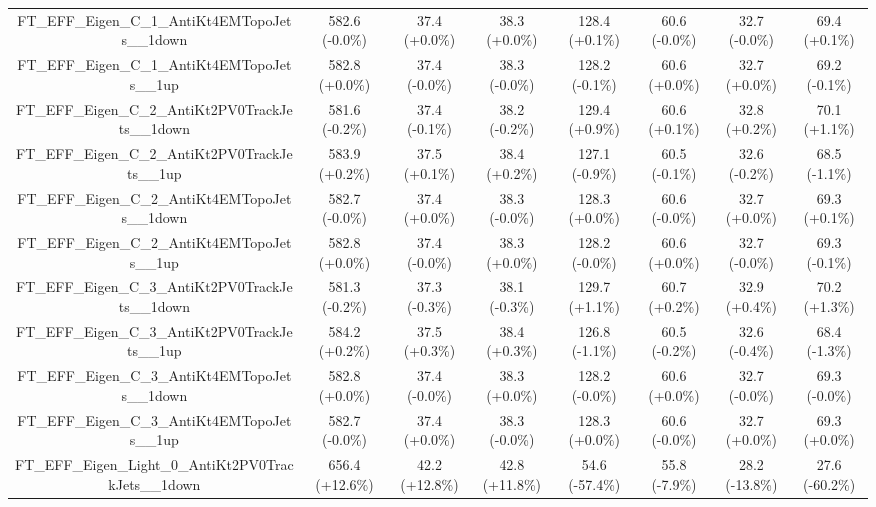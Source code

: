 \begin{table}[htbp!]
\begin{tiny}
\begin{center}
\begin{tabular}{c|c|c|c||c|c|c|c}
FT\_EFF\_Eigen\_C\_1\_AntiKt4EMTopoJets\_\_1down             & 582.6     (-0.0\%) & 37.4      (+0.0\%) & 38.3      (+0.0\%) & 128.4     (+0.1\%) & 60.6      (-0.0\%) & 32.7      (-0.0\%) & 69.4      (+0.1\%) \\ 
FT\_EFF\_Eigen\_C\_1\_AntiKt4EMTopoJets\_\_1up               & 582.8     (+0.0\%) & 37.4      (-0.0\%) & 38.3      (-0.0\%) & 128.2     (-0.1\%) & 60.6      (+0.0\%) & 32.7      (+0.0\%) & 69.2      (-0.1\%) \\ 
FT\_EFF\_Eigen\_C\_2\_AntiKt2PV0TrackJets\_\_1down           & 581.6     (-0.2\%) & 37.4      (-0.1\%) & 38.2      (-0.2\%) & 129.4     (+0.9\%) & 60.6      (+0.1\%) & 32.8      (+0.2\%) & 70.1      (+1.1\%) \\ 
FT\_EFF\_Eigen\_C\_2\_AntiKt2PV0TrackJets\_\_1up             & 583.9     (+0.2\%) & 37.5      (+0.1\%) & 38.4      (+0.2\%) & 127.1     (-0.9\%) & 60.5      (-0.1\%) & 32.6      (-0.2\%) & 68.5      (-1.1\%) \\ 
FT\_EFF\_Eigen\_C\_2\_AntiKt4EMTopoJets\_\_1down             & 582.7     (-0.0\%) & 37.4      (+0.0\%) & 38.3      (-0.0\%) & 128.3     (+0.0\%) & 60.6      (-0.0\%) & 32.7      (+0.0\%) & 69.3      (+0.1\%) \\ 
FT\_EFF\_Eigen\_C\_2\_AntiKt4EMTopoJets\_\_1up               & 582.8     (+0.0\%) & 37.4      (-0.0\%) & 38.3      (+0.0\%) & 128.2     (-0.0\%) & 60.6      (+0.0\%) & 32.7      (-0.0\%) & 69.3      (-0.1\%) \\ 
FT\_EFF\_Eigen\_C\_3\_AntiKt2PV0TrackJets\_\_1down           & 581.3     (-0.2\%) & 37.3      (-0.3\%) & 38.1      (-0.3\%) & 129.7     (+1.1\%) & 60.7      (+0.2\%) & 32.9      (+0.4\%) & 70.2      (+1.3\%) \\ 
FT\_EFF\_Eigen\_C\_3\_AntiKt2PV0TrackJets\_\_1up             & 584.2     (+0.2\%) & 37.5      (+0.3\%) & 38.4      (+0.3\%) & 126.8     (-1.1\%) & 60.5      (-0.2\%) & 32.6      (-0.4\%) & 68.4      (-1.3\%) \\ 
FT\_EFF\_Eigen\_C\_3\_AntiKt4EMTopoJets\_\_1down             & 582.8     (+0.0\%) & 37.4      (-0.0\%) & 38.3      (+0.0\%) & 128.2     (-0.0\%) & 60.6      (+0.0\%) & 32.7      (-0.0\%) & 69.3      (-0.0\%) \\ 
FT\_EFF\_Eigen\_C\_3\_AntiKt4EMTopoJets\_\_1up               & 582.7     (-0.0\%) & 37.4      (+0.0\%) & 38.3      (-0.0\%) & 128.3     (+0.0\%) & 60.6      (-0.0\%) & 32.7      (+0.0\%) & 69.3      (+0.0\%) \\ 
FT\_EFF\_Eigen\_Light\_0\_AntiKt2PV0TrackJets\_\_1down       & 656.4     (+12.6\%) & 42.2      (+12.8\%) & 42.8      (+11.8\%) & 54.6      (-57.4\%) & 55.8      (-7.9\%) & 28.2      (-13.8\%) & 27.6      (-60.2\%) \\ 

\end{tabular}
\end{center}
\end{tiny}
\end{table}
